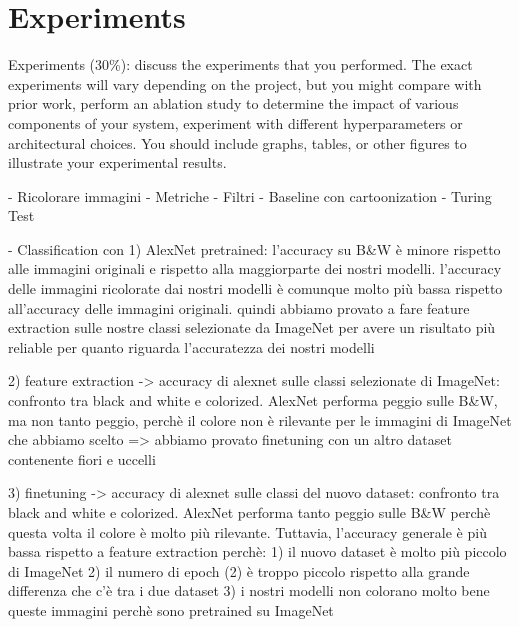 \section{Experiments}
Experiments (30\%): discuss the experiments that you performed. The exact experiments will vary
depending on the project, but you might compare with prior work, perform an ablation study to
determine the impact of various components of your system, experiment with different hyperparameters
or architectural choices. You should include graphs, tables, or other figures to illustrate your experimental results.

- Ricolorare immagini
- Metriche
- Filtri
- Baseline con cartoonization
- Turing Test

- Classification con
1) AlexNet pretrained: l'accuracy su B\&W è minore rispetto alle immagini originali e rispetto alla maggiorparte
dei nostri modelli. l'accuracy delle immagini ricolorate dai nostri modelli è comunque molto più bassa rispetto
all'accuracy delle immagini originali. quindi abbiamo provato a fare feature extraction sulle nostre classi
selezionate da ImageNet per avere un risultato più reliable per quanto riguarda l'accuratezza dei nostri modelli

2) feature extraction -> accuracy di alexnet sulle classi selezionate di ImageNet: confronto tra
black and white e colorized. AlexNet performa peggio sulle B\&W, ma non tanto peggio, perchè il colore non è
rilevante per le immagini di ImageNet che abbiamo scelto => abbiamo provato finetuning con un altro dataset
contenente fiori e uccelli

3) finetuning -> accuracy di alexnet sulle classi del nuovo dataset: confronto tra black and white e colorized.
AlexNet performa tanto peggio sulle B\&W perchè questa volta il colore è molto più rilevante. Tuttavia, l'accuracy
generale è più bassa rispetto a feature extraction perchè:
1) il nuovo dataset è molto più piccolo di ImageNet
2) il numero di epoch (2) è troppo piccolo rispetto alla grande differenza che c'è tra i due dataset
3) i nostri modelli non colorano molto bene queste immagini perchè sono pretrained su ImageNet




